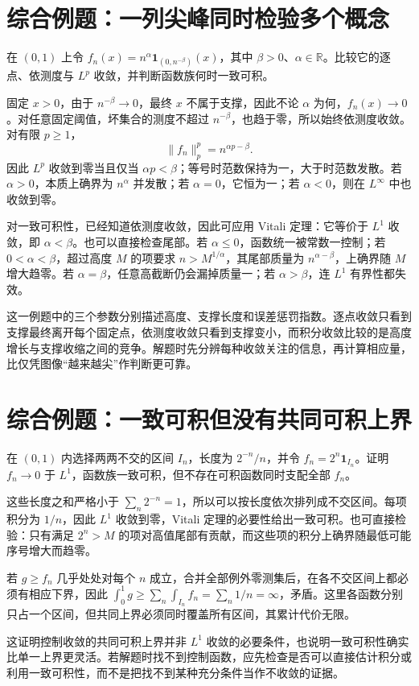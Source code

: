 \section{综合例题：一列尖峰同时检验多个概念}
\begin{example}
在 $(0,1)$ 上令 $f_n(x)=n^\alpha\mathbf1_{(0,n^{-\beta})}(x)$，其中 $\beta>0$、$\alpha\in\mathbb R$。比较它的逐点、依测度与 $L^p$ 收敛，并判断函数族何时一致可积。
\end{example}
\begin{solve}
固定 $x>0$，由于 $n^{-\beta}\to0$，最终 $x$ 不属于支撑，因此不论 $\alpha$ 为何，$f_n(x)\to0$。对任意固定阈值，坏集合的测度不超过 $n^{-\beta}$，也趋于零，所以始终依测度收敛。对有限 $p\geq1$，
\[
 \|f_n\|_p^p=n^{\alpha p-\beta}.
\]
因此 $L^p$ 收敛到零当且仅当 $\alpha p<\beta$；等号时范数保持为一，大于时范数发散。若 $\alpha>0$，本质上确界为 $n^\alpha$ 并发散；若 $\alpha=0$，它恒为一；若 $\alpha<0$，则在 $L^\infty$ 中也收敛到零。

对一致可积性，已经知道依测度收敛，因此可应用 Vitali 定理：它等价于 $L^1$ 收敛，即 $\alpha<\beta$。也可以直接检查尾部。若 $\alpha\leq0$，函数统一被常数一控制；若 $0<\alpha<\beta$，超过高度 $M$ 的项要求 $n>M^{1/\alpha}$，其尾部质量为 $n^{\alpha-\beta}$，上确界随 $M$ 增大趋零。若 $\alpha=\beta$，任意高截断仍会漏掉质量一；若 $\alpha>\beta$，连 $L^1$ 有界性都失效。
\end{solve}
这一例题中的三个参数分别描述高度、支撑长度和误差惩罚指数。逐点收敛只看到支撑最终离开每个固定点，依测度收敛只看到支撑变小，而积分收敛比较的是高度增长与支撑收缩之间的竞争。解题时先分辨每种收敛关注的信息，再计算相应量，比仅凭图像“越来越尖”作判断更可靠。

\section{综合例题：一致可积但没有共同可积上界}
\begin{example}
在 $(0,1)$ 内选择两两不交的区间 $I_n$，长度为 $2^{-n}/n$，并令 $f_n=2^n\mathbf1_{I_n}$。证明 $f_n\to0$ 于 $L^1$，函数族一致可积，但不存在可积函数同时支配全部 $f_n$。
\end{example}
\begin{solve}
这些长度之和严格小于 $\sum_n2^{-n}=1$，所以可以按长度依次排列成不交区间。每项积分为 $1/n$，因此 $L^1$ 收敛到零，Vitali 定理的必要性给出一致可积。也可直接检验：只有满足 $2^n>M$ 的项对高值尾部有贡献，而这些项的积分上确界随最低可能序号增大而趋零。

若 $g\geq f_n$ 几乎处处对每个 $n$ 成立，合并全部例外零测集后，在各不交区间上都必须有相应下界，因此
$\int_0^1g\geq\sum_n\int_{I_n}f_n=\sum_n1/n=\infty$，矛盾。这里各函数分别只占一个区间，但共同上界必须同时覆盖所有区间，其累计代价无限。
\end{solve}
这证明控制收敛的共同可积上界并非 $L^1$ 收敛的必要条件，也说明一致可积性确实比单一上界更灵活。若解题时找不到控制函数，应先检查是否可以直接估计积分或利用一致可积性，而不是把找不到某种充分条件当作不收敛的证据。

